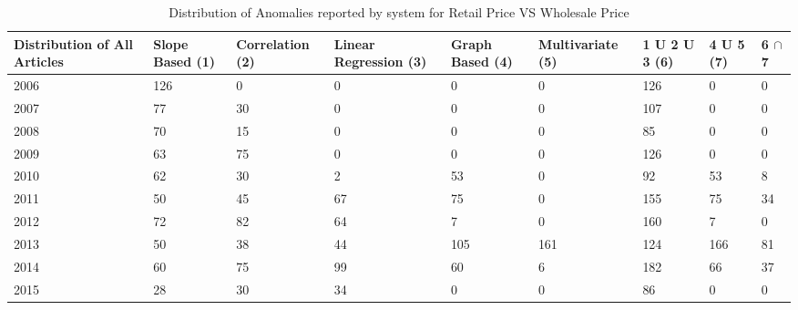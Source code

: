 	
	\begin{table}[]
	\centering
	\resizebox{\textwidth}{!}
	{\begin{tabular}{|l|l|l|l|l|l|l|l|l|}
	\hline
	Distribution of All Articles & Slope Based (1) & Correlation (2) & Linear Regression (3) & Graph Based (4) & Multivariate (5) & 1 U 2 U 3 (6) & 4 U 5 (7) & 6 $\cap$ 7  \\
	\hline
	2006 & 126 & 0  & 0  & 0   & 0   & 126 & 0   & 0  \\
	\hline
	2007 & 77  & 30 & 0  & 0   & 0   & 107 & 0   & 0  \\
	\hline
	2008 & 70  & 15 & 0  & 0   & 0   & 85  & 0   & 0  \\
	\hline
	2009 & 63  & 75 & 0  & 0   & 0   & 126 & 0   & 0  \\
	\hline
	2010 & 62  & 30 & 2  & 53  & 0   & 92  & 53  & 8  \\
	\hline
	2011 & 50  & 45 & 67 & 75  & 0   & 155 & 75  & 34 \\
	\hline
	2012 & 72  & 82 & 64 & 7   & 0   & 160 & 7   & 0  \\
	\hline
	2013 & 50  & 38 & 44 & 105 & 161 & 124 & 166 & 81 \\
	\hline
	2014 & 60  & 75 & 99 & 60  & 6   & 182 & 66  & 37 \\
	\hline
	2015 & 28  & 30 & 34 & 0   & 0   & 86  & 0   & 0  \\
	\hline
	\end{tabular}}
	\caption{Distribution of Anomalies reported by system for Retail Price VS Wholesale Price }
	\label{RetailVsWholesaleDist}
	\end{table}
	
